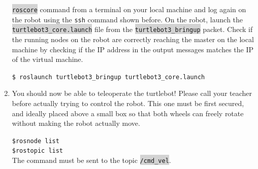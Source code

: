 \documentclass[10pt,a4paper,printanswers]{upmc}
\newcommand{\mytext}[1]{\colorbox{lightgray}{\texttt{#1}}}
\begin{document}
\begin{enumerate}
        \mytext{roscore} command from a terminal on your local machine and log again on the robot using the
        \texttt{ssh} command shown before. On the robot, launch the \mytext{turtlebot3\_core.launch} file
        from the \mytext{turtlebot3\_bringup} packet. Check if the running nodes on the robot are correctly
        reaching the master on the local machine by checking if the IP address in the output messages
        matches the IP of the virtual machine.
        \begin{solution}
          \texttt{\$ roslaunch turtlebot3\_bringup turtlebot3\_core.launch}
        \end{solution}

  \item  You should now be able to teleoperate the turtlebot! Please call your teacher before actually trying to control the robot. This one must be first secured, and ideally placed above a small box so that both wheels can freely rotate without making the robot actually move.
        \begin{solution}
          \texttt{\$rosnode list}\\
          \texttt{\$rostopic list}\\
          The command must be sent to the topic \mytext{/cmd\_vel}.
        \end{solution}

\end{enumerate}
\end{document}
